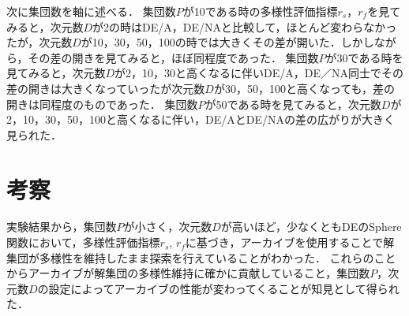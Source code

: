\documentclass[a4paper,11pt,oneside,openany]{jsbook}
\begin{document}
次に集団数を軸に述べる．
集団数$P$が10である時の多様性評価指標$r_s$，$r_f$を見てみると，次元数$D$が2の時はDE/A，DE/NAと比較して，ほとんど変わらなかったが，次元数$D$が10，30，50，100の時では大きくその差が開いた．しかしながら，その差の開きを見てみると，ほぼ同程度であった．
集団数$P$が30である時を見てみると，次元数$D$が2，10，30と高くなるに伴いDE/A，DE／NA同士でその差の開きは大きくなっていったが次元数$D$が30，50，100と高くなっても，差の開きは同程度のものであった．
集団数$P$が50である時を見てみると，次元数$D$が2，10，30，50，100と高くなるに伴い，DE/AとDE/NAの差の広がりが大きく見られた．


\section{考察}
実験結果から，集団数$P$が小さく，次元数$D$が高いほど，少なくともDEのSphere関数において，多様性評価指標$r_s$, $r_f$に基づき，アーカイブを使用することで解集団が多様性を維持したまま探索を行えていることがわかった．
これらのことからアーカイブが解集団の多様性維持に確かに貢献していること，集団数$P$，次元数$D$の設定によってアーカイブの性能が変わってくることが知見として得られた．
\end{document}
